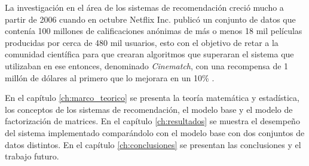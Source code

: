 La investigación en el área de los sistemas de recomendación creció mucho a partir de 2006 cuando en octubre Netflix Inc. publicó un conjunto de datos que contenía 100 millones de calificaciones anónimas de más o menos 18 mil películas producidas por cerca de 480 mil usuarios, esto con el objetivo de retar a la comunidad científica para que crearan algoritmos que superaran el sistema que utilizaban en ese entonces, denominado \textit{Cinematch}, con una recompensa de 1 millón de dólares al primero que lo mejorara en un 10\% \cite{bell2007lessons} \cite{bennett2007netflix} \cite{netflixprize}.

En el capítulo \ref{ch:marco_teorico} se presenta la teoría matemática y estadística, los conceptos de los sistemas de recomendación, el modelo base y el modelo de factorización de matrices. En el capítulo \ref{ch:resultados} se muestra el desempeño del sistema implementado comparándolo con el modelo base con dos conjuntos de datos distintos. En el capítulo \ref{ch:conclusiones} se presentan las conclusiones y el trabajo futuro.

